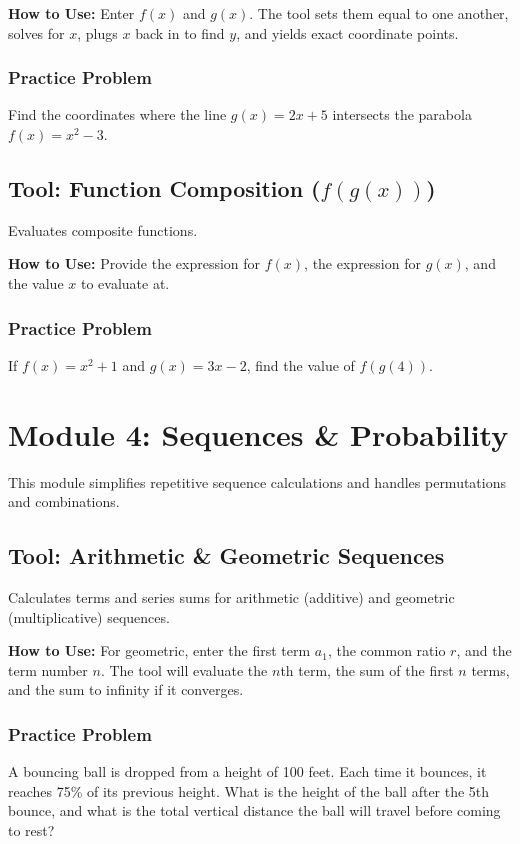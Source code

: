 \documentclass[11pt,a4paper]{article}
\begin{document}
\textbf{How to Use:} Enter $f(x)$ and $g(x)$. The tool sets them equal to one another, solves for $x$, plugs $x$ back in to find $y$, and yields exact coordinate points.

\subsubsection*{Practice Problem}
Find the coordinates where the line $g(x) = 2x + 5$ intersects the parabola $f(x) = x^2 - 3$.

\subsection{Tool: Function Composition ($f(g(x))$)}
Evaluates composite functions.

\textbf{How to Use:} Provide the expression for $f(x)$, the expression for $g(x)$, and the value $x$ to evaluate at. 

\subsubsection*{Practice Problem}
If $f(x) = x^2 + 1$ and $g(x) = 3x - 2$, find the value of $f(g(4))$.

\newpage
\section{Module 4: Sequences \& Probability}
This module simplifies repetitive sequence calculations and handles permutations and combinations.

\subsection{Tool: Arithmetic \& Geometric Sequences}
Calculates terms and series sums for arithmetic (additive) and geometric (multiplicative) sequences.

\textbf{How to Use:} For geometric, enter the first term $a_1$, the common ratio $r$, and the term number $n$. The tool will evaluate the $n$th term, the sum of the first $n$ terms, and the sum to infinity if it converges.

\subsubsection*{Practice Problem}
A bouncing ball is dropped from a height of 100 feet. Each time it bounces, it reaches 75\% of its previous height. What is the height of the ball after the 5th bounce, and what is the total vertical distance the ball will travel before coming to rest?
\end{document}
